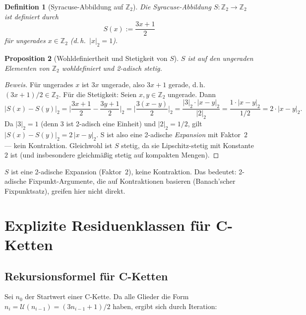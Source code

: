 \documentclass[12pt,a4paper]{article}
\newtheorem{definition}{Definition}[section]
\newtheorem{proposition}[definition]{Proposition}
\newenvironment{beweis}{\begin{proof}[Beweis]}{\end{proof}}
\newcommand{\U}{\mathcal{U}}
\newcommand{\Ztwo}{\mathbb{Z}_2}     %
\newcommand{\atwo}[1]{\lvert#1\rvert_2}  %
\begin{document}
\begin{definition}[Syracuse-Abbildung auf $\Ztwo$]
\label{def:syracuse}
Die \emph{Syracuse-Abbildung} $S\colon \Ztwo \to \Ztwo$ ist definiert durch
\[
  S(x) := \frac{3x+1}{2}
\]
für ungerades $x \in \Ztwo$ (d.\,h.\ $\atwo{x} = 1$).
\end{definition}

\begin{proposition}[Wohldefiniertheit und Stetigkeit von $S$]
\label{prop:stetig}
$S$ ist auf den ungeraden Elementen von $\Ztwo$ wohldefiniert und 2-adisch
stetig.
\end{proposition}

\begin{beweis}
Für ungerades $x$ ist $3x$ ungerade, also $3x+1$ gerade, d.\,h.\ $(3x+1)/2 \in \Ztwo$.
Für die Stetigkeit: Seien $x, y \in \Ztwo$ ungerade. Dann
\[
  \atwo{S(x) - S(y)}
  = \biggl\lvert\frac{3x+1}{2} - \frac{3y+1}{2}\biggr\rvert_2
  = \biggl\lvert\frac{3(x-y)}{2}\biggr\rvert_2
  = \frac{\atwo{3} \cdot \atwo{x-y}}{\atwo{2}}
  = \frac{1 \cdot \atwo{x-y}}{1/2}
  = 2 \cdot \atwo{x-y}.
\]
Da $\atwo{3} = 1$ (denn $3$ ist 2-adisch eine Einheit) und $\atwo{2} = 1/2$,
gilt $\atwo{S(x)-S(y)} = 2\,\atwo{x-y}$. S ist also eine 2-adische
\emph{Expansion} mit Faktor~$2$ --- kein Kontraktion. Gleichwohl ist $S$ stetig,
da sie Lipschitz-stetig mit Konstante $2$ ist (und insbesondere gleichmäßig
stetig auf kompakten Mengen).
\end{beweis}

\begin{tcolorbox}[warnung]
$S$ ist eine 2-adische Expansion (Faktor~$2$), keine Kontraktion. Das bedeutet:
2-adische Fixpunkt-Argumente, die auf Kontraktionen basieren (Banach'scher
Fixpunktsatz), greifen hier nicht direkt.
\end{tcolorbox}

\section{Explizite Residuenklassen für C-Ketten}

\subsection{Rekursionsformel für C-Ketten}

Sei $n_0$ der Startwert einer C-Kette. Da alle Glieder die Form
$n_i = \U(n_{i-1}) = (3n_{i-1}+1)/2$ haben, ergibt sich durch Iteration:
\end{document}
